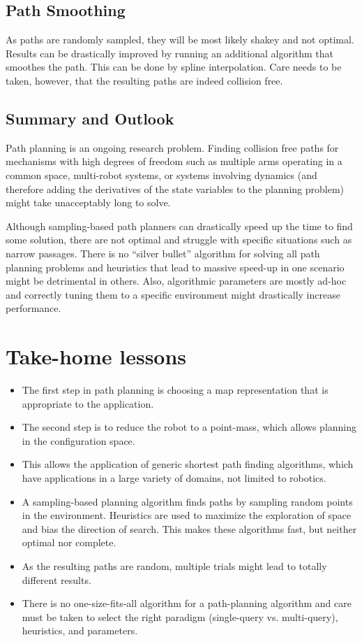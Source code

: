 \subsection{Path Smoothing}
As paths are randomly sampled, they will be most likely shakey and not optimal. Results can be drastically improved by running an additional algorithm that smoothes the path. This can be done by spline interpolation. Care needs to be taken, however, that the resulting paths are indeed collision free.

\subsection{Summary and Outlook}
Path planning is an ongoing research problem. Finding collision free paths for mechanisms with high degrees of freedom such as multiple arms operating in a common space, multi-robot systems, or systems involving dynamics (and therefore adding the derivatives of the state variables to the planning problem) might take unacceptably long to solve.

Although sampling-based path planners can drastically speed up the time to find some solution, there are not optimal and struggle with specific situations such as narrow passages. There is no ``silver bullet'' algorithm for solving all path planning problems and heuristics that lead to massive speed-up in one scenario might be detrimental in others. Also, algorithmic parameters are mostly ad-hoc and correctly tuning them to a specific environment might drastically increase performance.
 

\section*{Take-home lessons}
\begin{itemize}
\item The first step in path planning is choosing a map representation that is appropriate to the application.
\item The second step is to reduce the robot to a point-mass, which allows planning in the configuration space.
\item This allows the application of generic shortest path finding algorithms, which have applications in a large variety of domains, not limited to robotics.
\item A sampling-based planning algorithm finds paths by sampling random points in the environment. Heuristics are used to maximize the exploration of space and bias the direction of search. This makes these algorithms fast, but neither optimal nor complete.
\item As the resulting paths are random, multiple trials might lead to totally different results.
\item There is no one-size-fits-all algorithm for a path-planning algorithm and care must be taken to select the right paradigm (single-query vs. multi-query), heuristics, and parameters.
\end{itemize}
